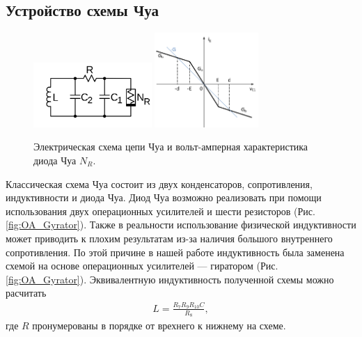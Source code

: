 \documentclass[12pt]{article}
\begin{document}
\subsection*{Устройство схемы Чуа}
\begin{figure}[H]
	\centering
	\includegraphics[width=0.4\textwidth]{Base_chua_curcuit.png}
	\hfil
	\includegraphics[width=0.35\textwidth]{chua_VAC.png}
	\caption{Электрическая схема цепи Чуа и вольт-амперная характеристика диода Чуа $N_R$.}
	\label{fig:base_curcuit}
\end{figure}
Классическая схема Чуа состоит из двух конденсаторов, сопротивления, индуктивности и диода Чуа.
Диод Чуа возможно реализовать при помощи использования двух операционных усилителей и шести резисторов (Рис. \ref{fig:OA_Gyrator}).
Также в реальности использование физической индуктивности может приводить к плохим результатам из-за наличия большого внутреннего
сопротивления. По этой причине в нашей работе индуктивность была заменена схемой на основе операционных усилителей --- гиратором (Рис. \ref{fig:OA_Gyrator}).
Эквивалентную индуктивность полученной схемы можно расчитать
\begin{eqnarray}
	L = \frac{R_7 R_9 R_{10} C}{R_8},
	\label{eq:gyrator}
\end{eqnarray}
где $R$ пронумерованы в порядке от врехнего к нижнему на схеме.
\end{document}
